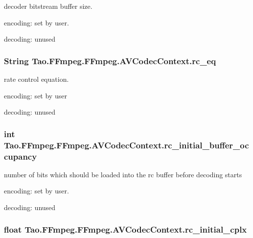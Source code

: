 \label{struct_tao_1_1_f_fmpeg_1_1_f_fmpeg_1_1_a_v_codec_context_aac210f61060313b8a718b990f5b8bafb}
decoder bitstream buffer size.
\begin{DoxyItemize}
\item encoding: set by user.
\item decoding: unused 
\end{DoxyItemize}\hypertarget{struct_tao_1_1_f_fmpeg_1_1_f_fmpeg_1_1_a_v_codec_context_a1ff8b28c9ac40826db2c434b7465352b}{
\subsubsection[{rc\_\-eq}]{\setlength{\rightskip}{0pt plus 5cm}String {\bf Tao.FFmpeg.FFmpeg.AVCodecContext.rc\_\-eq}}}
\label{struct_tao_1_1_f_fmpeg_1_1_f_fmpeg_1_1_a_v_codec_context_a1ff8b28c9ac40826db2c434b7465352b}
rate control equation.
\begin{DoxyItemize}
\item encoding: set by user
\item decoding: unused 
\end{DoxyItemize}\hypertarget{struct_tao_1_1_f_fmpeg_1_1_f_fmpeg_1_1_a_v_codec_context_a3e2e4582550934341278cf82d6729469}{
\subsubsection[{rc\_\-initial\_\-buffer\_\-occupancy}]{\setlength{\rightskip}{0pt plus 5cm}int {\bf Tao.FFmpeg.FFmpeg.AVCodecContext.rc\_\-initial\_\-buffer\_\-occupancy}}}
\label{struct_tao_1_1_f_fmpeg_1_1_f_fmpeg_1_1_a_v_codec_context_a3e2e4582550934341278cf82d6729469}
number of bits which should be loaded into the rc buffer before decoding starts
\begin{DoxyItemize}
\item encoding: set by user.
\item decoding: unused 
\end{DoxyItemize}\hypertarget{struct_tao_1_1_f_fmpeg_1_1_f_fmpeg_1_1_a_v_codec_context_a105a5045ac9e2d73bbc4e8c63a384542}{
\subsubsection[{rc\_\-initial\_\-cplx}]{\setlength{\rightskip}{0pt plus 5cm}float {\bf Tao.FFmpeg.FFmpeg.AVCodecContext.rc\_\-initial\_\-cplx}}}
